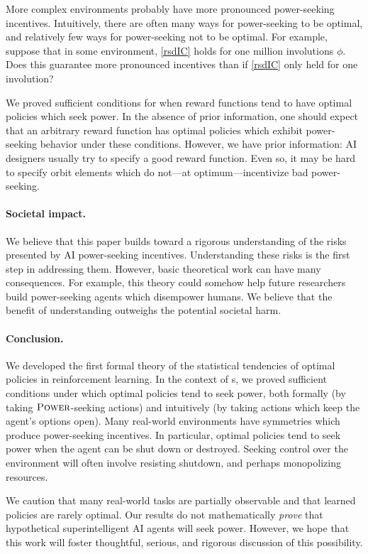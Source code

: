 More complex environments probably have more pronounced power-seeking incentives. Intuitively, there are often many ways for power-seeking to be optimal, and relatively few ways for power-seeking not to be optimal. For example, suppose that in some environment, \cref{rsdIC} holds for one million involutions $\phi$. Does this guarantee more pronounced incentives than if \cref{rsdIC} only held for one involution?

We proved sufficient conditions for when reward functions tend to have optimal policies which seek power. In the absence of prior information, one should expect that an arbitrary reward function has optimal policies which exhibit power-seeking behavior under these conditions. However, we have prior information: AI designers usually try to specify a good reward function. Even so, it may be hard to specify orbit elements which do not—at optimum—incentivize bad power-seeking.

\paragraph{Societal impact.} We believe that this paper builds toward a rigorous understanding of the risks presented by AI power-seeking incentives. Understanding these risks is the first step in addressing them. However, basic theoretical work can have many consequences. For example, this theory could somehow help future researchers build power-seeking agents which disempower humans. We believe that the benefit of understanding outweighs the potential societal harm. 
 
\paragraph{Conclusion.} 
We developed the first formal theory of the statistical tendencies of optimal policies in reinforcement learning. In the context of {\mdp}s, we proved sufficient conditions under which optimal policies tend to seek power, both formally (by taking $\text{\upshape\textsc{Power}}$-seeking actions) and intuitively (by taking actions which keep the agent's options open). Many real-world environments have symmetries which produce power-seeking incentives. In particular, optimal policies tend to seek power when the agent can be shut down or destroyed. Seeking control over the environment will often involve resisting shutdown, and perhaps monopolizing resources.

We caution that many real-world tasks are partially observable and that learned policies are rarely optimal. Our results do not mathematically \emph{prove} that hypothetical superintelligent AI agents will seek power. However, we hope that this work will foster thoughtful, serious, and rigorous discussion of this possibility.

